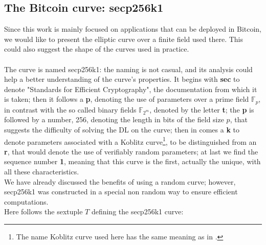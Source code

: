 \bigskip

\subsection{The Bitcoin curve: secp256k1}
Since this work is mainly focused on applications that can be deployed in Bitcoin, we would like to present the elliptic curve over a finite field used there. This could also suggest the shape of the curves used in practice.
\\
\\
The curve is named secp256k1: the naming is not casual, and its analysis could help a better understanding of the curve's properties. It begins with {\bf sec} to denote "Standards for Efficient Cryptography", the documentation from which it is taken; then it follows a {\bf p}, denoting the use of parameters over a prime field $\mathbb{F}_p$, in contrast with the so called binary fields $\mathbb{F}_{2^m}$, denoted by the letter {\bf t}; the {\bf p} is followed by a number, 256, denoting the length in bits of the field size $p$, that suggests the difficulty of solving the DL on the curve; then in comes a {\bf k} to denote parameters associated with a Koblitz curve\footnote{The name Koblitz curve used here has the same meaning as in \cite{RefWork:3}.}, to be distinguished from an {\bf r}, that would denote the use of verifiably random parameters; at last we find the sequence number {\bf 1}, meaning that this curve is the first, actually the unique, with all these characteristics.
\\
We have already discussed the benefits of using a random curve; however, secp256k1 was constructed in a special non random way to ensure efficient computations.
\\
Here follows the sextuple $T$ defining the secp256k1 curve:
